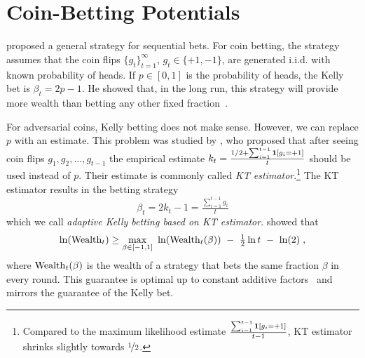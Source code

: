 \section{Coin-Betting Potentials}
\label{section:coin-betting-potentials}

\citet{Kelly-1956} proposed a general strategy for sequential bets. For coin
betting, the strategy assumes that the coin flips $\{g_t\}_{t=1}^\infty$, $g_t
\in \{+1,-1\}$, are generated i.i.d. with known probability of heads. If $p \in
[0,1]$ is the probability of heads, the Kelly bet is
$\beta_t = 2p - 1$.
He showed that, in the long run, this strategy will provide more wealth than
betting any other fixed fraction~\cite{Kelly-1956}.

For adversarial coins, Kelly betting does not make sense. However, we can
replace $p$ with an estimate. This problem was studied by \citet{Krichevsky-Trofimov-1981},
who proposed that after seeing coin flips $g_1, g_2, \dots, g_{t-1}$ the
empirical estimate $k_t = \frac{1/2 + \sum_{i=1}^{t-1} \mathbf{1}[g_i = +1]}{t}$
should be used instead of $p$. Their estimate is commonly called \emph{KT
estimator}.\footnote{Compared to the maximum likelihood estimate
$\frac{\sum_{i=1}^{t-1} \mathbf{1}[g_i = +1]}{t-1}$, KT estimator shrinks
slightly towards $\nicefrac{1}{2}$.} The KT estimator results in the betting strategy
\begin{equation}
\label{equation:kt-estimator-betting-strategy}
\beta_t = 2k_t - 1 = \tfrac{\sum_{i=1}^{t-1} g_i}{t}
\end{equation}
which we call \emph{adaptive Kelly betting based on KT estimator}.
\citeauthor{Krichevsky-Trofimov-1981} showed that
\[
\ln(\Wealth_t) \ge \max_{\beta \in [-1,1]} \  \ln(\Wealth_t(\beta)) \ - \ \tfrac{1}{2} \ln t \ - \ \ln(2) \; ,
\]
where $\operatorname{Wealth}_t(\beta)$ is the wealth of a strategy that bets the same
fraction $\beta$ in every round. This guarantee is optimal up to constant
additive factors~\citep{Cesa-Bianchi-Lugosi-2006} and mirrors the guarantee of the Kelly bet.

